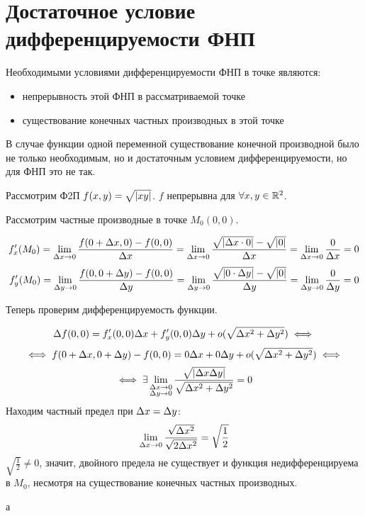 \documentclass[../../main.tex]{subfiles}
\begin{document}
\section{Достаточное условие дифференцируемости ФНП}

Необходимыми условиями дифференцируемости ФНП в точке являются:
\begin{itemize}
\item непрерывность этой ФНП в рассматриваемой точке
\item существование конечных частных производных в этой точке
\end{itemize}
В случае функции одной переменной существование конечной производной было
не только необходимым, но и достаточным условием дифференцируемости, но
для ФНП это не так.
\begin{exmp}
Рассмотрим Ф2П $f(x,y) = \sqrt{\left|{xy}\right|}$. $f$ непрерывна для $\forall x,y
\in \mathbb{R}^2$.

Рассмотрим частные производные в точке $M_0(0,0)$.

\[
f'_x(M_0) = 
\lim_{\Delta x \to 0} \frac{f(0+\Delta x, 0) -f(0,0)}{\Delta x}=
\lim_{\Delta x \to 0} \frac{\sqrt{\left|{\Delta x \cdot 0}\right|}-\sqrt{\left|{0}\right|}}{\Delta x}=
\lim_{\Delta x \to 0} \frac{0}{\Delta x}=
0
\]
\[
f'_y(M_0) = 
\lim_{\Delta y \to 0} \frac{f(0,0+\Delta y) -f(0,0)}{\Delta y}=
\lim_{\Delta y \to 0} \frac{\sqrt{\left|{0 \cdot \Delta y}\right|}-\sqrt{\left|{0}\right|}}{\Delta y}=
\lim_{\Delta y \to 0} \frac{0}{\Delta y}=
0
\]

Теперь проверим дифференцируемость функции.

\[\Delta f(0,0) = f'_x(0,0)\Delta x+f'_y(0,0)\Delta y + o(\sqrt{\Delta x^2+\Delta y^2})
\iff\]
\[\iff f(0+\Delta x,0+\Delta y)-f(0,0)=0\Delta x+0\Delta y+o(\sqrt{\Delta x^2+\Delta y^2})\iff\]
\[\iff \exists\lim_{\substack{\Delta x \to 0\\ \Delta y \to 0}}
\frac{\sqrt{\left|{\Delta x\Delta y}\right|}}{\sqrt{\Delta x^2+\Delta y^2}}=0\]
Находим частный предел при $\Delta x = \Delta y$:
\[\lim_{\Delta x \to 0}\frac{\sqrt{\Delta x^2}}{\sqrt{2\Delta x^2}} = \sqrt{\frac{1}
{2}}\]
$\sqrt{\frac{1}{2}}\neq 0$, значит, двойного предела не существует и
функция недифференцируема в $M_0$, несмотря на существование конечных
частных производных.
\end{exmp}
а
\end{document}
